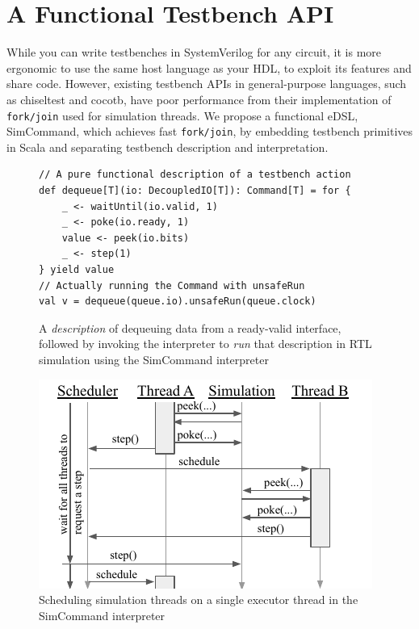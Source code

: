 \documentclass[sigplan,review,nonacm,9pt]{acmart}
\begin{document}
\section{A Functional Testbench API}

While you can write testbenches in SystemVerilog for any circuit, it is more ergonomic to use the same host language as your HDL, to exploit its features and share code.
However, existing testbench APIs in general-purpose languages, such as chiseltest\cite{chiseltest} and cocotb\cite{cocotb}, have poor performance from their implementation of \texttt{fork/join} used for simulation threads.
We propose a functional eDSL, SimCommand\cite{simcommand}, which achieves fast \texttt{fork/join}, by embedding testbench primitives in Scala and separating testbench description and interpretation.

\begin{figure}
\begin{verbatim}
// A pure functional description of a testbench action
def dequeue[T](io: DecoupledIO[T]): Command[T] = for {
    _ <- waitUntil(io.valid, 1)
    _ <- poke(io.ready, 1)
    value <- peek(io.bits)
    _ <- step(1)
} yield value
// Actually running the Command with unsafeRun
val v = dequeue(queue.io).unsafeRun(queue.clock)
\end{verbatim}
\caption{A \textit{description} of dequeuing data from a ready-valid interface, followed by invoking the interpreter to \textit{run} that description in RTL simulation using the SimCommand interpreter}
\label{fig:simcommand}
\end{figure}

\begin{figure}
\includegraphics[scale=1]{simcommand/scheduler.pdf}
\caption{Scheduling simulation threads on a single executor thread in the SimCommand interpreter}
\label{fig:simcommand_interp}
\end{figure}
\end{document}
